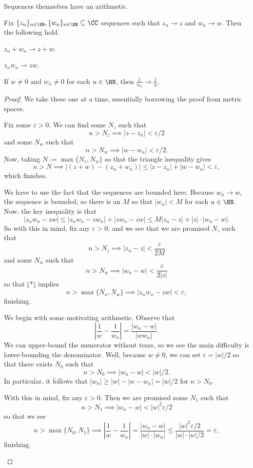 Sequences themselves have an arithmetic.
\begin{proposition}
	Fix $\{z_n\}_{n\in\NN},\{w_n\}_{n\in\NN}\subseteq\CC$ sequences such that $z_n\to z$ and $w_n\to w$. Then the following hold.
	\begin{listalph}
		\item $z_n+w_n\to z+w$.
		\item $z_nw_n\to zw$.
		\item If $w\ne0$ and $w_n\ne0$ for each $n\in\NN$, then $\frac1{w_n}\to\frac1w$.
	\end{listalph}
\end{proposition}
\begin{proof}
	We take these one at a time, essentially borrowing the proof from metric spaces.
	\begin{listalph}
		\item Fix some $\varepsilon>0$. We can find some $N_z$ such that
		\[n>N_z\implies|z-z_n|<\varepsilon/2\]
		and some $N_w$ such that
		\[n>N_w\implies|w-w_n|<\varepsilon/2.\]
		Now, taking $N:=\max\{N_z,N_w\}$ so that the triangle inequality gives
		\[n>N\implies|(z+w)-(z_n+w_n)|\le|z-z_n|+|w-w_n|<\varepsilon,\]
		which finishes.

		\item We have to use the fact that the sequences are bounded here. Because $w_n\to w$, the sequence is bounded, so there is an $M$ so that $|w_n|<M$ for each $n\in\NN$. Now, the key inequality is that
		\[|z_nw_n-zw|\le|z_nw_n-zw_n|+|zw_n-zw|\le M|z_n-z|+|z|\cdot|w_n-w|.\tag{$*$}\label{eq:multbound}\]
		So with this in mind, fix any $\varepsilon>0$, and we see that we are promised $N_z$ such that
		\[n>N_z\implies|z_n-z|<\frac\varepsilon{2M}\]
		and some $N_w$ such that
		\[n>N_w\implies|w_n-w|<\frac\varepsilon{2|z|}\]
		so that \hyperref[eq:multbound]{($*$)} implies
		\[n>\max\{N_x,N_w\}\implies|z_nw_n-zw|<\varepsilon,\]
		finishing.

		\item We begin with some motivating arithmetic. Observe that
		\[\left|\frac1w-\frac1{w_n}\right|=\frac{|w_n-w|}{|ww_n|}.\]
		We can upper-bound the numerator without tears, so we see the main difficulty is lower-bounding the denominator. Well, because $w\ne0$, we can set $\varepsilon=|w|/2$ so that there exists $N_0$ such that
		\[n>N_0\implies|w_n-w|<|w|/2.\]
		In particular, it follows that $|w_n|\ge|w|-|w-w_n|=|w|/2$ for $n>N_0$.

		With this in mind, fix any $\varepsilon>0$. Then we are promised some $N_1$ such that
		\[n>N_1\implies|w_n-w|<|w|^2\varepsilon/2\]
		so that we see
		\[n>\max\{N_0,N_1\}\implies\left|\frac1w-\frac1{w_n}\right|=\frac{|w_n-w|}{|w|\cdot|w_n|}\le\frac{|w|^2\varepsilon/2}{|w|\cdot|w|/2}=\varepsilon,\]
		finishing.
		\qedhere
	\end{listalph}
\end{proof}


